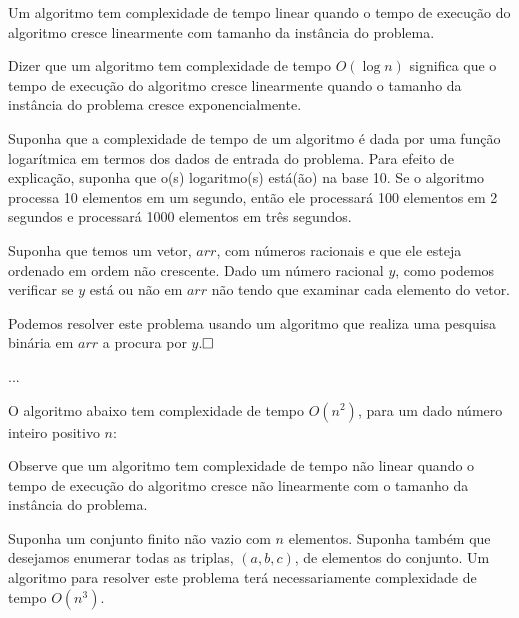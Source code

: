 
Um algoritmo tem complexidade de tempo linear quando o tempo de execução do algoritmo cresce linearmente com tamanho da instância do problema.


Dizer que um algoritmo tem complexidade de tempo $O(\log n)$ significa que o tempo de execução do algoritmo cresce linearmente quando o tamanho da instância do problema cresce exponencialmente. \vspace{0.3cm}

\begin{exmp}
Suponha que a complexidade de tempo de um algoritmo é dada por uma função logarítmica em termos dos dados de entrada do problema.  
Para efeito de explicação, suponha que o(s) logaritmo(s) está(ão) na base 10. 
Se o algoritmo processa 10 elementos em um segundo, então ele processará 100 elementos em 2 segundos e processará 1000 elementos em três segundos.
\end{exmp}


\begin{exerc}
Suponha que temos um vetor, $arr$, com números racionais e que ele esteja ordenado em ordem não crescente. Dado um número racional $y$, como podemos verificar se $y$ está ou não em $arr$ não tendo que examinar cada elemento do vetor. 
\end{exerc}


Podemos resolver este problema usando um algoritmo que realiza uma pesquisa binária em $arr$ a procura por $y$.$\hfill\Box$ 

...


\begin{exmp}
O algoritmo abaixo tem complexidade de tempo $O(n^2)$, para um dado número inteiro positivo $n$:
\end{exmp}

Observe que um algoritmo tem complexidade de tempo não linear quando o tempo de execução do algoritmo cresce não linearmente com o tamanho da instância do problema.


\begin{exmp}
Suponha um conjunto finito não vazio com $n$ elementos. Suponha também que desejamos enumerar todas as triplas, $(a,b,c)$, de elementos do conjunto. Um algoritmo para resolver este problema terá necessariamente complexidade de tempo $O(n^3)$.   
\end{exmp}


